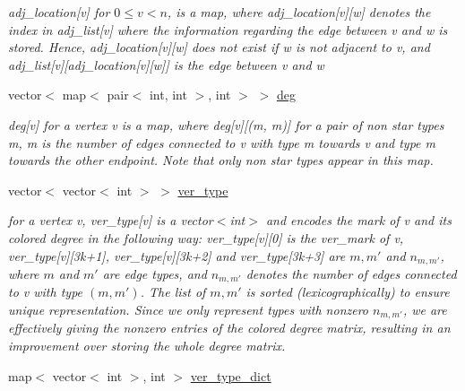 \begin{DoxyCompactItemize}
\begin{DoxyCompactList}\small\item\em adj\+\_\+location\mbox{[}v\mbox{]} for $0 \leq v < n$, is a map, where adj\+\_\+location\mbox{[}v\mbox{]}\mbox{[}w\mbox{]} denotes the index in adj\+\_\+list\mbox{[}v\mbox{]} where the information regarding the edge between v and w is stored. Hence, adj\+\_\+location\mbox{[}v\mbox{]}\mbox{[}w\mbox{]} does not exist if w is not adjacent to v, and adj\+\_\+list\mbox{[}v\mbox{]}\mbox{[}adj\+\_\+location\mbox{[}v\mbox{]}\mbox{[}w\mbox{]}\mbox{]} is the edge between v and w \end{DoxyCompactList}\item 
vector$<$ map$<$ pair$<$ int, int $>$, int $>$ $>$ \hyperlink{classcolored__graph_ae3269d35c1b022bc70d195bebd4e1b8a}{deg}
\begin{DoxyCompactList}\small\item\em deg\mbox{[}v\mbox{]} for a vertex v is a map, where deg\mbox{[}v\mbox{]}\mbox{[}(m, m\textquotesingle{})\mbox{]} for a pair of non star types m, m\textquotesingle{} is the number of edges connected to v with type m towards v and type m\textquotesingle{} towards the other endpoint. Note that only non star types appear in this map. \end{DoxyCompactList}\item 
vector$<$ vector$<$ int $>$ $>$ \hyperlink{classcolored__graph_a2cc32e7146fa3319f83cfa940f5e1be4}{ver\+\_\+type}
\begin{DoxyCompactList}\small\item\em for a vertex v, ver\+\_\+type\mbox{[}v\mbox{]} is a vector$<$int$>$ and encodes the mark of v and its colored degree in the following way\+: ver\+\_\+type\mbox{[}v\mbox{]}\mbox{[}0\mbox{]} is the ver\+\_\+mark of v, ver\+\_\+type\mbox{[}v\mbox{]}\mbox{[}3k+1\mbox{]}, ver\+\_\+type\mbox{[}v\mbox{]}\mbox{[}3k+2\mbox{]} and ver\+\_\+type\mbox{[}3k+3\mbox{]} are $m, m'$ and $n_{m, m'}$, where $m$ and $m'$ are edge types, and $n_{m, m'}$ denotes the number of edges connected to v with type $(m, m')$. The list of $m, m'$ is sorted (lexicographically) to ensure unique representation. Since we only represent types with nonzero $n_{m, m'}$, we are effectively giving the nonzero entries of the colored degree matrix, resulting in an improvement over storing the whole degree matrix. \end{DoxyCompactList}\item 
map$<$ vector$<$ int $>$, int $>$ \hyperlink{classcolored__graph_aeb780762429ddac375799f4a45405712}{ver\+\_\+type\+\_\+dict}

\end{DoxyCompactItemize}
